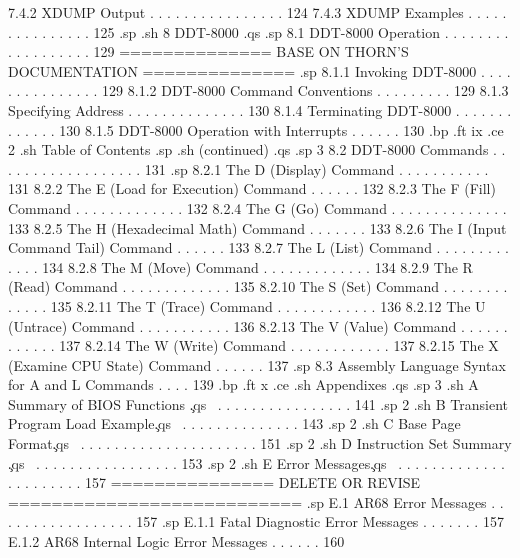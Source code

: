        7.4.2  XDUMP  Output  . . . . . . . . . . . . . . . . 124 
        7.4.3  XDUMP  Examples  . . . . . . . . . . . . . . . 125 
.sp
.sh
8  DDT-8000  
.qs
.sp
   8.1  DDT-8000 Operation . . . . . . . . . . . . . . . . . . 129
============== BASE ON THORN'S DOCUMENTATION ==============
.sp
        8.1.1  Invoking DDT-8000 . . . . . . . . . . . . . . . 129
        8.1.2  DDT-8000 Command Conventions  . . . . . . . . . 129 
        8.1.3  Specifying Address . . . . . . . . . . . . . . 130 
        8.1.4  Terminating DDT-8000  . . . . . . . . . . . . . 130 
        8.1.5  DDT-8000 Operation with Interrupts  . . . . . . 130 
.bp
.ft                                 ix
.ce 2
.sh
Table of Contents
.sp
.sh
(continued)
.qs
.sp 3
   8.2  DDT-8000 Commands  . . . . . . . . . . . . . . . . . . 131
.sp
        8.2.1  The D (Display) Command  . . . . . . . . . . . 131
        8.2.2  The E (Load for Execution) Command . . . . . . 132
        8.2.3  The F (Fill) Command . . . . . . . . . . . . . 132 
        8.2.4  The G (Go) Command . . . . . . . . . . . . . . 133 
        8.2.5  The H (Hexadecimal Math) Command . . . . . . . 133 
        8.2.6  The I (Input Command Tail) Command . . . . . . 133 
        8.2.7  The L (List) Command . . . . . . . . . . . . . 134 
        8.2.8  The M (Move) Command . . . . . . . . . . . . . 134 
        8.2.9  The R (Read) Command . . . . . . . . . . . . . 135 
        8.2.10 The S (Set) Command  . . . . . . . . . . . . . 135 
        8.2.11 The T (Trace) Command  . . . . . . . . . . . . 136 
        8.2.12 The U (Untrace) Command  . . . . . . . . . . . 136 
        8.2.13 The V (Value) Command  . . . . . . . . . . . . 137 
        8.2.14 The W (Write) Command  . . . . . . . . . . . . 137 
        8.2.15 The X (Examine CPU State) Command  . . . . . . 137 
.sp
   8.3  Assembly Language Syntax for A and L Commands . . . . 139
.bp
.ft                                  x
.ce
.sh
Appendixes
.qs
.sp 3
.sh
A  Summary of BIOS Functions \c
.qs
\ . . . . . . . . . . . . . . . . 141
.sp 2
.sh
B  Transient Program Load Example\c
.qs
\ . . . . . . . . . . . . . . 143
.sp 2
.sh
C  Base Page Format\c
.qs
\ . . . . . . . . . . . . . . . . . . . . . 151
.sp 2
.sh
D  Instruction Set Summary \c
.qs
\ . . . . . . . . . . . . . . . . . 153
.sp 2
.sh
E  Error Messages\c
.qs
\ . . . . . . . . . . . . . . . . . . . . . . 157
=============== DELETE OR REVISE ===========================
.sp
   E.1  AR68 Error Messages . . . . . . . . . . . . . . . . . 157 
.sp
        E.1.1  Fatal Diagnostic Error Messages  . . . . . . . 157 
        E.1.2  AR68 Internal Logic Error Messages . . . . . . 160 
